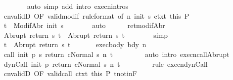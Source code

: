 \begin{isabellebody}
\ \ \ \ \ \ \isamarkupfalse%
\ {\isacharparenleft}auto\ simp\ add{\isacharcolon}\ intro{\isacharcolon}\ execn{\isachardot}intros{\isacharparenright}\isanewline
\ \ \ \ \isamarkupfalse%
\ cnvalidD\ {\isacharbrackleft}OF\ valid{\isacharunderscore}modif{\isacharprime}\ {\isacharbrackleft}rule{\isacharunderscore}format{\isacharcomma}\ of\ n\ {\isachardoublequoteopen}init\ s{\isachardoublequoteclose}{\isacharbrackright}\ ctxt\ this{\isacharbrackright}\ P\isanewline
\ \ \ \ \isamarkupfalse%
\ {\isachardoublequoteopen}t{\isacharprime}\ {\isasymin}\ ModifAbr\ {\isacharparenleft}init\ s{\isacharparenright}{\isachardoublequoteclose}\isanewline
\ \ \ \ \ \ \isamarkupfalse%
\ auto\isanewline
\ \ \ \ \isamarkupfalse%
\ ret{\isacharunderscore}modifAbr\ \isamarkupfalse%
\ {\isachardoublequoteopen}Abrupt\ {\isacharparenleft}return\ s\ t{\isacharprime}{\isacharparenright}\ {\isacharequal}\ Abrupt\ {\isacharparenleft}return{\isacharprime}\ s\ t{\isacharprime}{\isacharparenright}{\isachardoublequoteclose}\isanewline
\ \ \ \ \ \ \isamarkupfalse%
\ simp\isanewline
\ \ \ \ \isamarkupfalse%
\ \isamarkupfalse%
\ {\isachardoublequoteopen}t\ {\isacharequal}\ Abrupt\ {\isacharparenleft}return{\isacharprime}\ s\ t{\isacharprime}{\isacharparenright}{\isachardoublequoteclose}\ \isacommand{{\isachardot}}\isamarkupfalse%
\isanewline
\ \ \ \ \isamarkupfalse%
\ exec{\isacharunderscore}body\ bdy\ n\isanewline
\ \ \ \ \isamarkupfalse%
\ {\isachardoublequoteopen}{\isasymGamma}{\isasymturnstile}{\isasymlangle}call\ init\ {\isacharparenleft}p\ s{\isacharparenright}\ return{\isacharprime}\ c{\isacharcomma}Normal\ s{\isasymrangle}\ {\isacharequal}n{\isasymRightarrow}\ t{\isachardoublequoteclose}\ \isanewline
\ \ \ \ \ \ \isamarkupfalse%
\ {\isacharparenleft}auto\ intro{\isacharcolon}\ execn{\isacharunderscore}callAbrupt{\isacharparenright}\isanewline
\ \ \ \ \isamarkupfalse%
\ {\isachardoublequoteopen}{\isasymGamma}{\isasymturnstile}{\isasymlangle}dynCall\ init\ p\ return{\isacharprime}\ c{\isacharcomma}Normal\ s{\isasymrangle}\ {\isacharequal}n{\isasymRightarrow}\ t{\isachardoublequoteclose}\ \isanewline
\ \ \ \ \ \ \isamarkupfalse%
\ {\isacharparenleft}rule\ execn{\isacharunderscore}dynCall{\isacharparenright}\isanewline
\ \ \ \ \isamarkupfalse%
\ cnvalidD\ {\isacharbrackleft}OF\ valid{\isacharunderscore}call\ ctxt\ this{\isacharbrackright}\ P\ t{\isacharunderscore}notin{\isacharunderscore}F\isanewline

\end{isabellebody}

